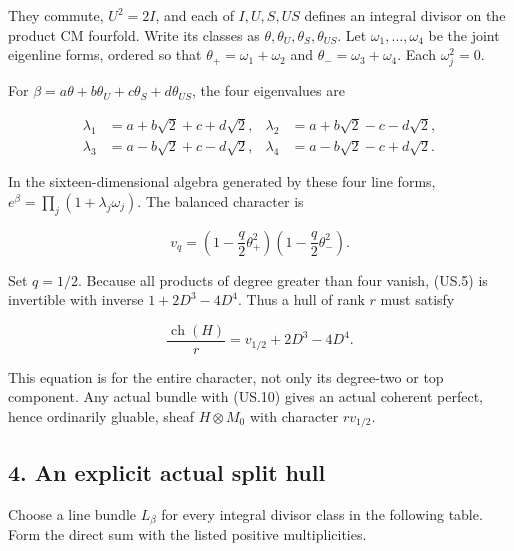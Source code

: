 They commute, \(U^2=2I\), and each of \(I,U,S,US\) defines an integral
divisor on the product CM fourfold. Write its classes as
\(\theta,\theta_U,\theta_S,\theta_{US}\). Let
\(\omega_1,\ldots,\omega_4\) be the joint eigenline forms, ordered so
that \(\theta_+=\omega_1+\omega_2\) and \(\theta_-=\omega_3+\omega_4\).
Each \(\omega_j^2=0\).

For \(\beta=a\theta+b\theta_U+c\theta_S+d\theta_{US}\), the four
eigenvalues are

\[
 \begin{split}
 \lambda_1&=a+b\sqrt2+c+d\sqrt2,&
 \lambda_2&=a+b\sqrt2-c-d\sqrt2,\\
 \lambda_3&=a-b\sqrt2+c-d\sqrt2,&
 \lambda_4&=a-b\sqrt2-c+d\sqrt2.
 \end{split}
 \tag{US.8}
\]

In the sixteen-dimensional algebra generated by these four line forms,
\(e^\beta=\prod_j(1+\lambda_j\omega_j)\). The balanced character is

\[
 v_q=\left(1-\frac q2\theta_+^2\right)
      \left(1-\frac q2\theta_-^2\right).
 \tag{US.9}
\]

Set \(q=1/2\). Because all products of degree greater than four vanish,
(US.5) is invertible with inverse \(1+2D^3-4D^4\). Thus a hull of rank
\(r\) must satisfy

\[
 \frac{\operatorname{ch}(H)}r
       =v_{1/2}+2D^3-4D^4.
 \tag{US.10}
\]

This equation is for the entire character, not only its degree-two or
top component. Any actual bundle with (US.10) gives an actual coherent
perfect, hence ordinarily gluable, sheaf \(H\otimes M_0\) with character
\(r v_{1/2}\).

\subsection{4. An explicit actual split
hull}\label{SF-US-an-explicit-actual-split-hull}

Choose a line bundle \(L_\beta\) for every integral divisor class in the
following table. Form the direct sum with the listed positive
multiplicities.

